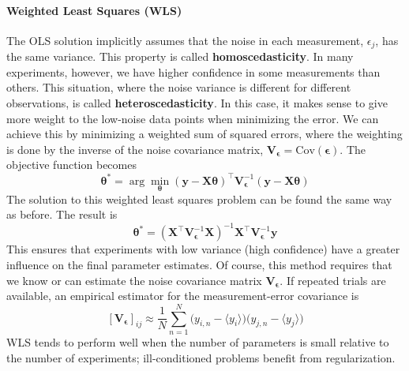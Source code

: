 \paragraph*{Weighted Least Squares (WLS)}
The OLS solution implicitly assumes that the noise in each measurement, $\epsilon_j$, has the same variance. This property is called \textbf{homoscedasticity}. In many experiments, however, we have higher confidence in some measurements than others. This situation, where the noise variance is different for different observations, is called \textbf{heteroscedasticity}. In this case, it makes sense to give more weight to the low-noise data points when minimizing the error. We can achieve this by minimizing a weighted sum of squared errors, where the weighting is done by the inverse of the noise covariance matrix, $\mathbf{V}_{\boldsymbol{\epsilon}} = \text{Cov}(\boldsymbol{\epsilon})$. The objective function becomes
\begin{equation}
    \boldsymbol{\theta}^* = \arg\min_{\boldsymbol{\theta}} (\mathbf{y} - \mathbf{X}\boldsymbol{\theta})^\top \mathbf{V}_{\boldsymbol{\epsilon}}^{-1} (\mathbf{y} - \mathbf{X}\boldsymbol{\theta})
\end{equation}
The solution to this weighted least squares problem can be found the same way as before. The result is
\begin{equation}
    \boldsymbol{\theta}^* = (\mathbf{X}^\top\mathbf{V}_{\boldsymbol{\epsilon}}^{-1}\mathbf{X})^{-1}\mathbf{X}^\top\mathbf{V}_{\boldsymbol{\epsilon}}^{-1}\mathbf{y}
\end{equation}
This ensures that experiments with low variance (high confidence) have a greater influence on the final parameter estimates. Of course, this method requires that we know or can estimate the noise covariance matrix $\mathbf{V}_{\boldsymbol{\epsilon}}$. If repeated trials are available, an empirical estimator for the measurement-error covariance is
\begin{equation*}
    \left[\mathbf{V}_{\boldsymbol{\epsilon}}\right]_{ij} \approx \frac{1}{N} \sum_{n=1}^{N} \big(y_{i,n} - \langle y_i\rangle\big)\big(y_{j,n} - \langle y_j\rangle\big)
\end{equation*}
WLS tends to perform well when the number of parameters is small relative to the number of experiments; ill-conditioned problems benefit from regularization.

